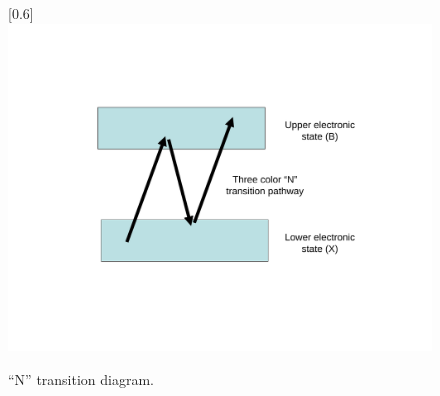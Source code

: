 \begin{figure}
\scalebox{0.6}[0.6]{
\includegraphics[bb=35 125 489 450]
{pathways_N/pathways_N.pdf}
}
\caption[``N'' transition diagram]{``N'' transition diagram.}
\label{pathways_N}
\end{figure}
